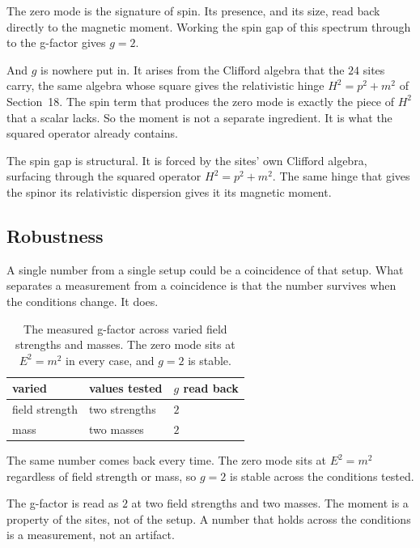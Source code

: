 The zero mode is the signature of spin. Its presence, and its size, read back directly to the magnetic moment. Working the spin gap of this spectrum through to the g-factor gives $g = 2$.

And $g$ is nowhere put in. It arises from the Clifford algebra that the $24$ sites carry, the same algebra whose square gives the relativistic hinge $H^2 = p^2 + m^2$ of Section~18. The spin term that produces the zero mode is exactly the piece of $H^2$ that a scalar lacks. So the moment is not a separate ingredient. It is what the squared operator already contains.

\begin{principle}
The spin gap is structural. It is forced by the sites' own Clifford algebra, surfacing through the squared operator $H^2 = p^2 + m^2$. The same hinge that gives the spinor its relativistic dispersion gives it its magnetic moment.
\end{principle}

\subsection{Robustness}

A single number from a single setup could be a coincidence of that setup. What separates a measurement from a coincidence is that the number survives when the conditions change. It does.

\begin{table}[ht]
\centering
\begin{tabular}{@{}lll@{}}
\toprule
varied & values tested & $g$ read back \\
\midrule
field strength & two strengths & $2$ \\
mass & two masses & $2$ \\
\bottomrule
\end{tabular}
\caption{The measured g-factor across varied field strengths and masses. The zero mode sits at $E^2 = m^2$ in every case, and $g = 2$ is stable.}
\label{tab:g-robust}
\end{table}

The same number comes back every time. The zero mode sits at $E^2 = m^2$ regardless of field strength or mass, so $g = 2$ is stable across the conditions tested.

\begin{principle}
The g-factor is read as $2$ at two field strengths and two masses. The moment is a property of the sites, not of the setup. A number that holds across the conditions is a measurement, not an artifact.
\end{principle}

